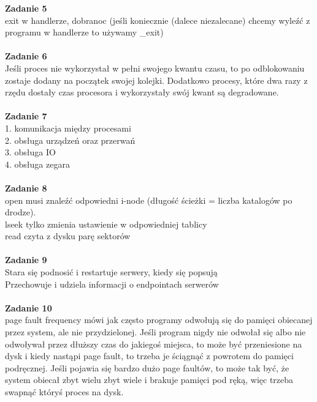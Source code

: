 \documentclass[12pt, a4paper, polish, openany]{book}
\begin{document}
\textbf{Zadanie 5} \\
exit w handlerze, dobranoc (jeśli koniecznie (dalece niezalecane) chcemy wyleźć z programu w
handlerze to używamy \_exit) \\\\
\textbf{Zadanie 6} \\
Jeśli proces nie wykorzystał w pełni swojego kwantu czasu, to po odblokowaniu zostaje dodany
na początek swojej kolejki. Dodatkowo procesy, które dwa razy z rzędu dostały czas procesora i wykorzystały swój kwant są degradowane. \\\\
\textbf{Zadanie 7} \\
1. komunikacja między procesami \\
2. obsługa urządzeń oraz przerwań \\
3. obsługa IO \\
4. obsługa zegara \\\\
\textbf{Zadanie 8} \\
open musi znaleźć odpowiedni i-node (długość ścieżki = liczba katalogów po drodze). \\
lseek tylko zmienia ustawienie w odpowiedniej tablicy \\
read czyta z dysku parę sektorów \\\\
\textbf{Zadanie 9} \\
Stara się podnosić i restartuje serwery, kiedy się popsują \\
Przechowuje i udziela informacji o endpointach serwerów \\\\
\textbf{Zadanie 10} \\
page fault frequency mówi jak często programy odwołują się do pamięci obiecanej przez system, ale nie przydzielonej. Jeśli program nigdy nie odwołał się albo nie odwoływał przez dłuższy czas do jakiegoś miejsca, to może być przeniesione na dysk i kiedy nastąpi page fault, to trzeba je ściągnąć z powrotem do pamięci podręcznej. Jeśli pojawia się bardzo dużo page faultów, to może tak być, że system obiecał zbyt wielu zbyt wiele i brakuje pamięci pod ręką, więc trzeba swapnąć któryś proces na dysk. \\\\
\end{document}
